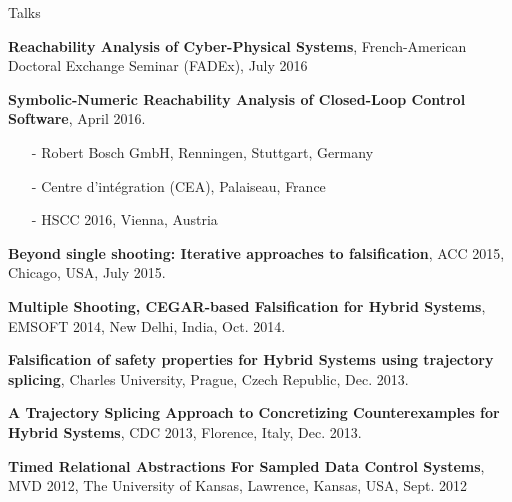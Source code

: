 \documentclass{resume} %
\begin{document}
\begin{rSection}{Talks}

\textbf{Reachability Analysis of Cyber-Physical Systems},
French-American Doctoral Exchange Seminar (FADEx),
July 2016

\textbf{Symbolic-Numeric Reachability Analysis of Closed-Loop Control Software}, April 2016.
	\begin{itemize}
    \itemsep-6pt
      \item[-] Robert Bosch GmbH, Renningen, Stuttgart, Germany
      \item[-] Centre d'intégration (CEA), Palaiseau, France
      \item[-] HSCC 2016, Vienna, Austria
    \end{itemize}

\textbf{Beyond single shooting: Iterative approaches to falsification},
ACC 2015, Chicago, USA,
July 2015.

\textbf{Multiple Shooting, CEGAR-based Falsification for Hybrid Systems},
EMSOFT 2014, New Delhi, India,
Oct. 2014.

\textbf{Falsification of safety properties for Hybrid Systems using trajectory splicing},
Charles University, Prague, Czech Republic,
Dec. 2013.

\textbf{A Trajectory Splicing Approach to Concretizing Counterexamples for Hybrid Systems},
CDC 2013, Florence, Italy,
Dec. 2013.

\textbf{Timed Relational Abstractions For Sampled Data Control Systems},
MVD 2012, The University of Kansas, Lawrence, Kansas, USA,
Sept. 2012
\end{rSection}

\end{document}

